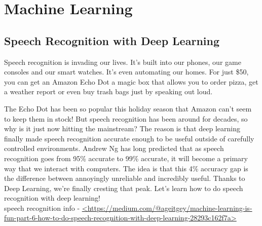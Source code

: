 \chapter{Machine Learning}\label{ch:ch4label}

\section{Speech Recognition with Deep Learning}

Speech recognition is invading our lives. It’s built into our phones, our game consoles and our smart watches. It’s even automating our homes. For just \$50, you can get an Amazon Echo Dot a magic box that allows you to order pizza, get a weather report or even buy trash bags just by speaking out loud.\\


The Echo Dot has been so popular this holiday season that Amazon can’t seem to keep them in stock!
But speech recognition has been around for decades, so why is it just now hitting the mainstream? The reason is that deep learning finally made speech recognition accurate enough to be useful outside of carefully controlled environments.
Andrew Ng has long predicted that as speech recognition goes from 95\% accurate to 99\% accurate, it will become a primary way that we interact with computers. The idea is that this 4\% accuracy gap is the difference between annoyingly unreliable and incredibly useful. Thanks to Deep Learning, we’re finally cresting that peak.
Let’s learn how to do speech recognition with deep learning!\\



speech recognition info - \url{<https://medium.com/@ageitgey/machine-learning-is-fun-part-6-how-to-do-speech-recognition-with-deep-learning-28293c162f7a>}